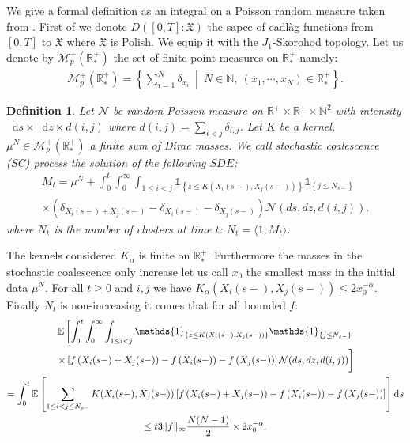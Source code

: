 \documentclass[11pt,a4paper]{article}
\newcommand{\RR}{\mathbb{R}}
\newcommand{\NN}{\mathbb{N}}
\newcommand{\RRP}{\mathbb{R}^+_*}
\newcommand{\MC}{\mathcal{M}}
\newcommand{\NC}{\mathcal{N}}
\newcommand{\XF}{\mathfrak{X}}
\newcommand{\SC}{{\emph{SC}}}
\newcommand{\E}[1]{\mathbb{E}\left[#1\right]}
\newcommand{\indic}[1]{\mathds{1}_{\left\lbrace#1\right\rbrace}}
\newcommand{\dd}{\mathop{}\!\mathrm{d}}
\newtheorem{definition}[theorem]{Definition}
\begin{document}
We give a formal definition as an integral on a Poisson random measure taken from \cite{fournier2006some,fournierStochasticCoalescenceHomogeneouslike2009}. First of we denote $D\left([0,T]: \XF\right)$ the sapce of cadlàg functions from $[0,T]$ to $\XF$ where $\XF$ is Polish. We equip it with the $J_1$-Skorohod topology. Let us denote by $\MC_p^+(\RRP)$ the set of finite point measures on $\RRP$ namely:
\begin{align*}
    \MC_p^+(\RRP) = \left\lbrace \sum\limits_{i = 1}^N \delta_{x_i}\  \middle|\  N\in \NN,\  (x_1,\cdots,x_N) \in \RRP \right\rbrace. 
\end{align*}
\begin{definition}
    Let $\NC$ be random Poisson measure on $\RR^+ \times \RR^+ \times \NN^2$ with intensity $\dd s \times \dd z \times d(i,j)$ where $d(i,j) = \sum\limits_{i < j} \delta_{i,j}$. Let $K$ be a kernel, $\mu^N \in \MC_p^+(\RRP)$ a finite sum of Dirac masses. We call stochastic coalescence (\SC) process the solution of the following $SDE$:
    \begin{multline*}
        M_t = \mu^N + \int_0^t \int_0^\infty \int_{1 \leq i <j }  \indic{z \leq K(X_{i}(s-),X_{j}(s-))} \indic{j \leq N_{s-}} \\ \times \left(\delta_{X_{i}(s-) + X_{j}(s-)} - \delta_{X_{i}(s-)} - \delta_{X_{j}(s-)}\right)\mathcal{N}(ds,dz,d(i,j)).
    \end{multline*}
    where $N_t$ is the number of clusters at time $t$: $N_t = \langle 1 , M_t\rangle$.
\end{definition}
The kernels considered $K_\alpha$ is finite on $\RRP$. Furthermore the masses in the stochastic coalescence only increase let us call $x_0$ the smallest mass in the initial data $\mu^N$. For all $t \geq 0$ and $i,j$ we have $K_\alpha(X_{i}(s-),X_{j}(s-)) \leq 2x_0^{-\alpha}$. Finally $N_t$ is non-increasing it comes that for all bounded $f$:
\begin{multline*}
    \mathbb{E} \left[ \int_0^t \int_0^\infty \int_{1 \leq i <j }  \indic{z \leq K(X_{i}(s-),X_{j}(s-))} \indic{j \leq N_{s-}}\right. \\
    \left. \times   \left[f\left(X_{i}(s-) + X_{j}(s-)\right) - f\left(X_{i}(s-)\right) - f\left( X_{j}(s-)\right)\right]\mathcal{N}(ds,dz,d(i,j)) \vphantom{\int_0^t \int_0^\infty \int_{i <j } }\right] \\
    = \int_0^t \E{\sum\limits_{1 \leq i< j \leq N_{s-}} K(X_{i}(s-),X_{j}(s-))\left[f\left(X_{i}(s-) + X_{j}(s-)\right) - f\left(X_{i}(s-)\right) - f\left( X_{j}(s-)\right)\right] } \dd s \\
    \leq t 3\|f\|_{\infty}\dfrac{N(N-1)}{2} \times 2 x_0^{-\alpha} .
\end{multline*}
\end{document}
